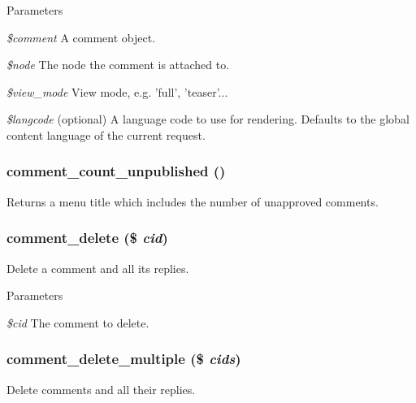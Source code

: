 \begin{DoxyParams}{Parameters}
\item[{\em \$comment}]A comment object. \item[{\em \$node}]The node the comment is attached to. \item[{\em \$view\_\-mode}]View mode, e.g. 'full', 'teaser'... \item[{\em \$langcode}](optional) A language code to use for rendering. Defaults to the global content language of the current request. \end{DoxyParams}
\hypertarget{comment_8module_a820a1c431691e6fe98c711d9a55b8081}{
\subsubsection[{comment\_\-count\_\-unpublished}]{\setlength{\rightskip}{0pt plus 5cm}comment\_\-count\_\-unpublished ()}}
\label{comment_8module_a820a1c431691e6fe98c711d9a55b8081}
Returns a menu title which includes the number of unapproved comments. \hypertarget{comment_8module_a6d3b67392abba22fa52fe27b9b3d0481}{
\subsubsection[{comment\_\-delete}]{\setlength{\rightskip}{0pt plus 5cm}comment\_\-delete (\$ {\em cid})}}
\label{comment_8module_a6d3b67392abba22fa52fe27b9b3d0481}
Delete a comment and all its replies.


\begin{DoxyParams}{Parameters}
\item[{\em \$cid}]The comment to delete. \end{DoxyParams}
\hypertarget{comment_8module_addaa817d25b383e341236a805ae6bea1}{
\subsubsection[{comment\_\-delete\_\-multiple}]{\setlength{\rightskip}{0pt plus 5cm}comment\_\-delete\_\-multiple (\$ {\em cids})}}
\label{comment_8module_addaa817d25b383e341236a805ae6bea1}
Delete comments and all their replies.


